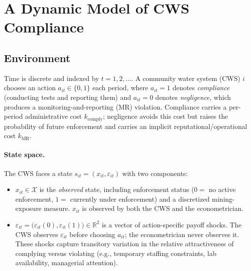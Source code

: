 
\section{A Dynamic Model of CWS Compliance}
\label{sec:model}

\subsection{Environment}

Time is discrete and indexed by $t = 1, 2, \ldots$. A community water system
(CWS) $i$ chooses an action $a_{it} \in \{0, 1\}$ each period, where $a_{it} = 1$
denotes \emph{compliance} (conducting tests and reporting them) and $a_{it} = 0$
denotes \emph{negligence}, which produces a monitoring-and-reporting (MR)
violation. Compliance carries a per-period administrative cost $k_{\text{comply}}$;
negligence avoids this cost but raises the probability of future enforcement and
carries an implicit reputational/operational cost $k_{\text{MR}}$.

\paragraph{State space.} The CWS faces a state $s_{it} = (x_{it}, \varepsilon_{it})$
with two components:
\begin{itemize}
\item $x_{it} \in \mathcal{X}$ is the \emph{observed} state, including
      enforcement status ($0 = $ no active enforcement, $1 = $ currently under
      enforcement) and a discretized mining-exposure measure. $x_{it}$ is
      observed by both the CWS and the econometrician.
\item $\varepsilon_{it} = \big(\varepsilon_{it}(0), \varepsilon_{it}(1)\big)
      \in \mathbb{R}^2$ is a vector of action-specific payoff shocks. The CWS
      observes $\varepsilon_{it}$ before choosing $a_{it}$; the econometrician
      never observes it. These shocks capture transitory variation in the
      relative attractiveness of complying versus violating (e.g., temporary
      staffing constraints, lab availability, managerial attention).
\end{itemize}

